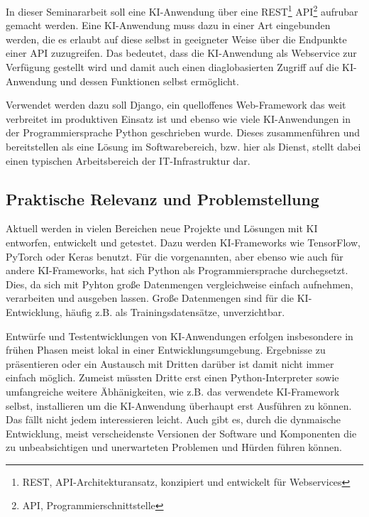 \documentclass[12pt,oneside,titlepage,listof=totoc,bibliography=totoc]{scrartcl}
\begin{document}
In dieser Seminararbeit soll eine \ac{KI}-Anwendung über eine \acs{REST}\footnote{\acl{REST}, API-Architekturansatz, konzipiert und entwickelt für Webservices} \acs{API}\footnote{\acl{API}, Programmierschnittstelle} aufrubar gemacht werden. Eine \ac{KI}-Anwendung muss dazu in einer Art eingebunden werden, die es erlaubt auf diese selbst in geeigneter Weise über die Endpunkte einer API zuzugreifen. Das bedeutet, dass die \ac{KI}-Anwendung als Webservice zur Verfügung gestellt wird und damit auch einen diaglobasierten Zugriff auf die \ac{KI}-Anwendung und dessen Funktionen selbst ermöglicht. 

Verwendet werden dazu soll Django, ein quelloffenes Web-Framework das weit verbreitet im produktiven Einsatz ist und ebenso wie viele \ac{KI}-Anwendungen in der Programmiersprache Python geschrieben wurde. Dieses zusammenführen und bereitstellen als eine Lösung im Softwarebereich, bzw. hier als Dienst, stellt dabei einen typischen Arbeitsbereich der IT-Infrastruktur dar. 

\subsection{Praktische Relevanz und Problemstellung}

Aktuell werden in vielen Bereichen neue Projekte und Lösungen mit \ac{KI} entworfen, entwickelt und getestet. Dazu werden \ac{KI}-Frameworks wie TensorFlow, PyTorch oder Keras benutzt. Für die vorgenannten, aber ebenso wie auch für andere \ac{KI}-Frameworks, hat sich Python als Programmiersprache durchegsetzt. Dies, da sich mit Pyhton große Datenmengen vergleichweise einfach aufnehmen, verarbeiten und ausgeben lassen. Große Datenmengen sind für die \ac{KI}-Entwicklung, häufig z.B. als Trainingsdatensätze, unverzichtbar. 

Entwürfe und Testentwicklungen von \ac{KI}-Anwendungen erfolgen insbesondere in frühen Phasen meist lokal in einer Entwicklungsumgebung. Ergebnisse zu präsentieren oder ein Austausch mit Dritten darüber ist damit nicht immer einfach möglich. Zumeist müssten Dritte erst einen Python-Interpreter sowie umfangreiche weitere Äbhänigkeiten, wie z.B. das verwendete \ac{KI}-Framework selbst, installieren um die \ac{KI}-Anwendung überhaupt erst Ausführen zu können. Das fällt nicht jedem interessieren leicht. Auch gibt es, durch die dynmaische Entwicklung, meist verscheidenste Versionen der Software und Komponenten die zu unbeabsichtigen und unerwarteten Problemen und Hürden führen können.
\end{document}
